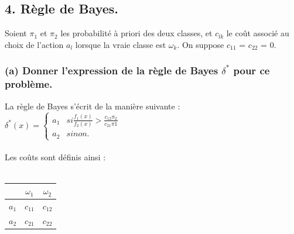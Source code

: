 \documentclass[a4paper, 10pt]{article}
\begin{document}
\subsection*{4. Règle de Bayes.}
Soient $\pi_{1}$ et $\pi_{2}$ les probabilité à priori des deux classes,
et \textit{$c_{lk}$} le coût associé au choix de l'action \textit{$a_{l}$} lorsque la vraie classe est $\omega_{k}$.
On suppose \textit{$c_{11}$} = \textit{$c_{22}$} = 0.

\subsubsection*{(a) Donner l'expression de la règle de Bayes $\delta^{*}$ pour ce problème.}
La règle de Bayes s'écrit de la manière suivante :\\
$\delta^{*}(x) =
\begin{cases} 
  a_{1} & si \frac{f_{1}(x)}{f_{2}(x)} > \frac{c_{12}\pi_{2}}{c_{21}\pi{1}} \\
  a_{2} & sinon.
\end{cases}$\\ \\
Les coûts sont définis ainsi :\\ \\
\begin{tabular}{|c|c|c|}
\hline
& $\omega_{1}$ & $\omega_{2}$ \\
\hline
$a_{1}$ & $c_{11}$ & $c_{12}$ \\
\hline
$a_{2}$ & $c_{21}$ & $c_{22}$ \\
\hline
\end{tabular}\\ \\
\end{document}
